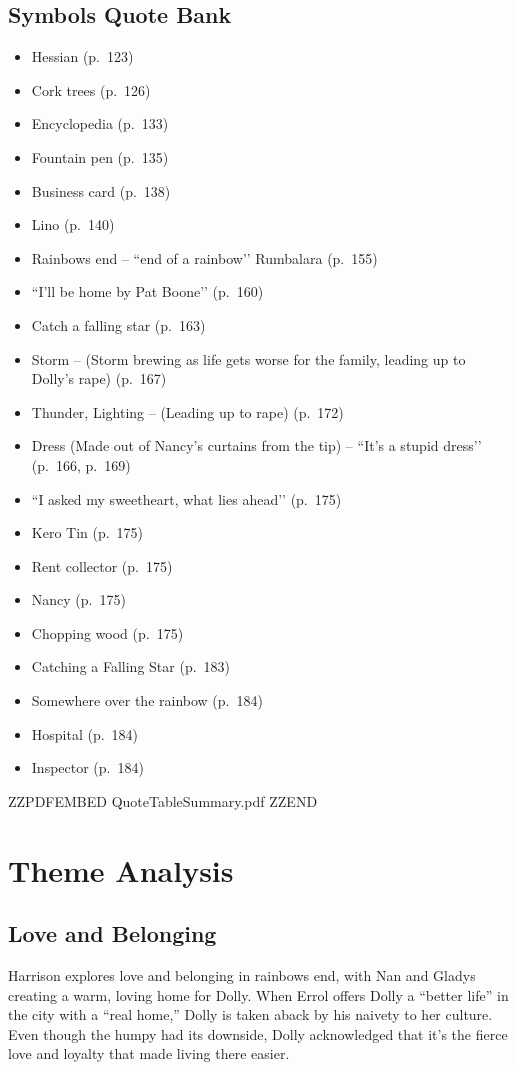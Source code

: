 \documentclass[a4paper]{article}
\begin{document}
\subsection{Symbols Quote Bank}
\begin{itemize}
    \item Hessian (p.~123)
    \item Cork trees (p.~126)
    \item Encyclopedia (p.~133)
    \item Fountain pen (p.~135)
    \item Business card (p.~138)
    \item Lino (p.~140)
    \item Rainbows end – ``end of a rainbow’’ Rumbalara (p.~155)
    \item ``I’ll be home by Pat Boone’’ (p.~160)
    \item Catch a falling star (p.~163)
    \item Storm – (Storm brewing as life gets worse for the family, leading up to Dolly’s rape) (p.~167)
    \item Thunder, Lighting – (Leading up to rape) (p.~172)
    \item Dress (Made out of Nancy’s curtains from the tip) – ``It’s a stupid dress’’ (p.~166, p.~169)
    \item ``I asked my sweetheart, what lies ahead’’ (p.~175)
    \item Kero Tin (p.~175)
    \item Rent collector (p.~175)
    \item Nancy (p.~175)
    \item Chopping wood (p.~175)
    \item Catching a Falling Star (p.~183)
    \item Somewhere over the rainbow (p.~184)
    \item Hospital (p.~184)
    \item Inspector (p.~184)
\end{itemize}
\newpage



ZZPDFEMBED QuoteTableSummary.pdf ZZEND



\newpage
\section{Theme Analysis}

\subsection{Love and Belonging}
Harrison explores love and belonging in rainbows end, with Nan and Gladys creating a warm, loving home for Dolly. When Errol offers Dolly a “better life” in the city with a “real home,” Dolly is taken aback by his naivety to her culture. Even though the humpy had its downside, Dolly acknowledged that it's the fierce love and loyalty that made living there easier. 
\end{document}
